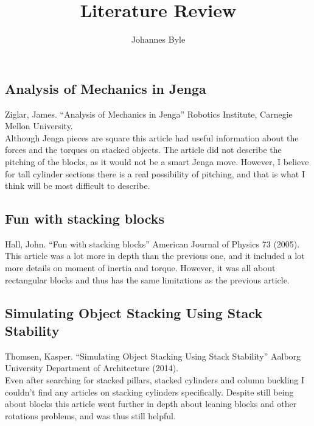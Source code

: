 \documentclass{article}
\begin{document}
\title{Literature Review}
\author{Johannes Byle}
\maketitle


\subsection*{Analysis of Mechanics in Jenga}
Ziglar, James. “Analysis of Mechanics in Jenga” Robotics Institute, Carnegie Mellon University.\\

Although Jenga pieces are square this article had useful information about the forces and the torques on stacked objects. The article did not describe the pitching of the blocks, as it would not be a smart Jenga move. However, I believe for tall cylinder sections there is a real possibility of pitching, and that is what I think will be most difficult to describe.

\subsection*{Fun with stacking blocks}
Hall, John. “Fun with stacking blocks” American Journal of Physics 73 (2005).\\

This article was a lot more in depth than the previous one, and it included a lot more details on moment of inertia and torque. However, it was all about rectangular blocks and thus has the same limitations as the previous article.

\subsection*{Simulating Object Stacking Using Stack Stability}
Thomsen, Kasper. “Simulating Object Stacking Using Stack Stability” Aalborg University Department of Architecture (2014).\\

Even after searching for stacked pillars, stacked cylinders and column buckling I couldn't find any articles on stacking cylinders specifically. Despite still being about blocks this article went further in depth about leaning blocks and other rotations problems, and was thus still helpful.
\end{document}
